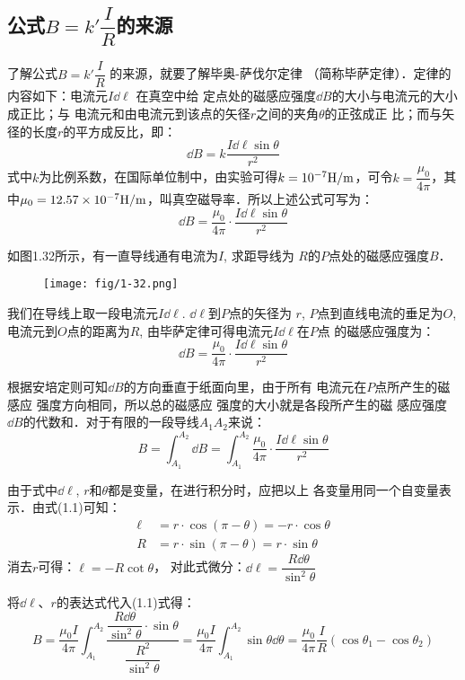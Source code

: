\subsection{公式$B=k'\dfrac{I}{R}$的来源}
了解公式$B=k'\dfrac{I}{R}$
的来源，就要了解毕奥-萨伐尔定律
（简称毕萨定律）．定律的内容如下：电流元$I\dd\ell$ 在真空中给
定点处的磁感应强度$\dd B$的大小与电流元的大小成正比；与
电流元和由电流元到该点的矢径$r$之间的夹角$\theta$的正弦成正
比；而与矢径的长度$r$的平方成反比，即：
\[\dd B=k\frac{I\dd \ell\sin\theta}{r^2}\]
式中$k$为比例系数，在国际单位制中，由实验可得$k=10^{-7}{\rm H/m}$，可令$k=\dfrac{\mu_0}{4\pi}$，其中$\mu_0=12.57\times 10^{-7}{\rm H/m}$，叫真空磁导率．所以上述公式可写为：
\[\dd B=\frac{\mu_0}{4\pi}\cdot \frac{I\dd \ell\sin\theta}{r^2}\]

如图1.32所示，有一直导线通有电流为$I$, 求距导线为
$R$的$P$点处的磁感应强度$B$．

\begin{figure}[htp]
    \centering
    \texttt{[image: fig/1-32.png]}
    \caption{}
\end{figure}

我们在导线上取一段电流元$I\dd\ell$. $\dd\ell$到$P$点的矢径为
$r$, $P$点到直线电流的垂足为$O$,
电流元到$O$点的距离为$R$, 由毕萨定律可得电流元$I\dd\ell$在$P$点
的磁感应强度为：
\[\dd B=\frac{\mu_0}{4\pi}\cdot \frac{I\dd \ell\sin\theta}{r^2}\]

根据安培定则可知$\dd B$的方向垂直于纸面向里，由于所有
电流元在$P$点所产生的磁感应
强度方向相同，所以总的磁感应
强度的大小就是各段所产生的磁
感应强度$\dd B$的代数和．对于有限的一段导线$A_1A_2$来说：
\begin{equation}
    B=\int^{A_2}_{A_1}\dd B=\int^{A_2}_{A_1}\frac{\mu_0}{4\pi}\cdot \frac{I\dd \ell\sin\theta}{r^2}
\end{equation}

由于式中$\dd\ell$, $r$和$\theta$都是变量，在进行积分时，应把以上
各变量用同一个自变量表示．由式(1.1)可知：
\[\begin{split}
    \ell&=r\cdot \cos(\pi-\theta)=-r\cdot \cos\theta\\
    R&=r\cdot \sin(\pi-\theta)=r\cdot \sin\theta
\end{split}\]
消去$r$可得：$\ell=-R\cot\theta$，
对此式微分：$\dd\ell=\dfrac{R\dd \theta}{\sin^2\theta}$

将$\dd\ell$、$r$的表达式代入(1.1)式得：
\[B=\frac{\mu_0 I}{4\pi}\int^{A_2}_{A_1}\frac{\dfrac{R\dd\theta}{\sin^2\theta}\cdot \sin\theta}{\dfrac{R^2}{\sin^2\theta}}=\frac{\mu_0 I}{4\pi}\int^{A_2}_{A_1}\sin\theta\dd\theta=\frac{\mu_0}{4\pi}\frac{I}{R}(\cos\theta_1-\cos\theta_2)\]

